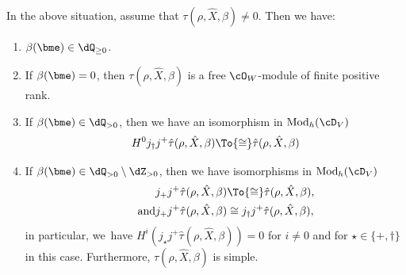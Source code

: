 \begin{cor}\label{cor:LocColocHatTau}
In the above situation, assume that $\tau(\rho,\hat{X},\beta)\neq 0$. Then we have:
\begin{enumerate}
\item $\beta(\bme)\in\dQ_{\geq 0}$.
\item
If $\beta(\bme) = 0$, then $\tau(\rho, \hat{X},\beta)$ is a free $\cO_W$\nobreakdash-mod\-ule of finite positive rank.

\item
If $\beta(\bme) \in \dQ_{>0}$, then
we have an isomorphism in $\textup{Mod}_h(\cD_V)$
\[
H^0j_\dag j^+ \hat{\tau}(\rho, \hat{X}, \beta) \To{\cong}\hat{\tau}(\rho, \hat{X}, \beta)
\]

\item
If $\beta(\bme) \in \dQ_{>0}\setminus \dZ_{>0}$, then
we have isomorphisms in $\textup{Mod}_h(\cD_V)$
\begin{align*}
j_+ j^+ \hat{\tau}(\rho, \hat{X}, \beta) &\To{\cong}\hat{\tau}(\rho, \hat{X}, \beta),
\\ \tag*{and}
j_+j^+\hat{\tau}(\rho, \hat{X}, \beta) &\cong j_\dag j^+ \hat{\tau}(\rho, \hat{X}, \beta),
\end{align*}
in particular, we~have $H^i(j_\star j^+\hat{\tau}(\rho, \hat{X}, \beta))=0$ for $i\neq 0$ and for $\star\in\{+,\dag\}$ in this case. Furthermore, $\tau(\rho,\hat{X},\beta)$ is simple.
\end{enumerate}
\end{cor}

